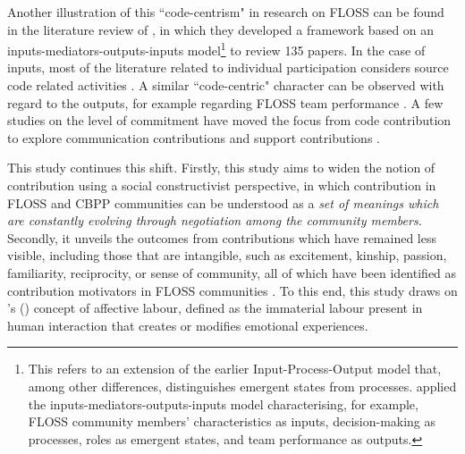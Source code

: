 Another illustration of this ``code-centrism" in research on FLOSS can be found in the literature review of \textcite{crowston2012free}, in which they developed a framework based on an inputs-mediators-outputs-inputs model\footnote{This refers to an extension of the earlier Input-Process-Output model \parencite{hackman1975group} that, among other differences, distinguishes emergent states from processes. \textcite{crowston2012free} applied the inputs-mediators-outputs-inputs model characterising, for example, FLOSS community members' characteristics as inputs, decision-making as processes, roles as emergent states, and team performance as outputs.} \parencite{ilgen2005teams} to review 135 papers. In the case of inputs, most of the literature related to individual participation considers source code related activities \parencite[e.g.,][]{luthiger2005fun, robles2005evolution, Roberts2006, fershtman2007open}. A similar ``code-centric" character can be observed with regard to the outputs, for example regarding FLOSS team performance \parencite[e.g.,][]{bezroukov1999second, samoladas2004open, gyimothy2005empirical, de2005handling}. A few studies on the level of commitment have moved the focus from code contribution \parencite[e.g.,][]{mockus2000case, mockus2002two} to explore communication contributions \parencite{crowston2006hierarchy} and support contributions \parencite{lakhani2003open}.

This study continues this shift. Firstly, this study aims to widen the notion of contribution using a social constructivist perspective, in which contribution in FLOSS and CBPP communities can be understood as a \textsl{set of meanings which are constantly evolving through negotiation among the community members.} Secondly, it unveils the outcomes from contributions which have remained less visible, including those that are intangible, such as excitement, kinship, passion, familiarity, reciprocity, or sense of community, all of which have been identified as contribution motivators in FLOSS communities \parencite[e.g.,][]{zeitlyn2003gift, freeman2007material, fang2009understanding}. To this end, this study draws on \citeauthor{hardt1999affective}'s (\citeyear{hardt1999affective}) concept of affective labour, defined as the immaterial labour present in human interaction that creates or modifies emotional experiences.

